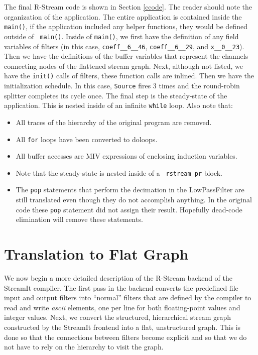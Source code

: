 \documentclass[10pt, letterpaper, onecolumn]{article}
\begin{document}
The final R-Stream code is shown in Section \ref{ccode}.  The reader
should note the organization of the application.  The entire
application is contained inside the {\tt main()}, if the application
included any helper functions, they would be defined outside of {\tt
  main()}.  Inside of {\tt main()}, we first have the definition of
any field variables of filters (in this case, {\tt  coeff\_\_6\_\_46},
{\tt coeff\_\_6\_\_29}, and {\tt x\_\_0\_\_23}).  Then we have the definitions
of the buffer variables that represent the channels connecting nodes of
the flattened stream graph.  Next, although not listed, we have the 
{\tt init()} calls of filters, these function calls are inlined.
Then we have the initialization schedule.  In this case, {\tt Source}
fires 3 times and the round-robin splitter completes its cycle once.
The final step is the steady-state of the application.  This is nested
inside of an infinite {\tt while} loop.  Also note that:

\begin{itemize}
\item All traces of the hierarchy of the original program are removed.
\item All {\tt for} loops have been converted to {doloop}s.
\item All buffer accesses are MIV expressions of enclosing induction
  variables.
\item Note that the steady-state is nested inside of a {\tt
  rstream\_pr} block.
\item The {\tt pop} statements that perform the decimation in the
  LowPassFilter are still translated even though they do not
  accomplish anything.  In the original code these {\tt pop} statement
  did not assign their result.  Hopefully dead-code elimination will
  remove these statements.
\end{itemize}

\section{Translation to Flat Graph}
We now begin a more detailed description of the R-Stream backend of
the StreamIt compiler.  The first pass in the backend converts the
predefined file input and output filters into ``normal'' filters that
are defined by the compiler to read and write {\em ascii} elements,
one per line for both floating-point values and integer values.  Next,
we convert the structured, hierarchical stream graph constructed by
the StreamIt frontend into a flat, unstructured graph.  This is done
so that the connections between filters become explicit and so that we
do not have to rely on the hierarchy to visit the graph.
\end{document}
